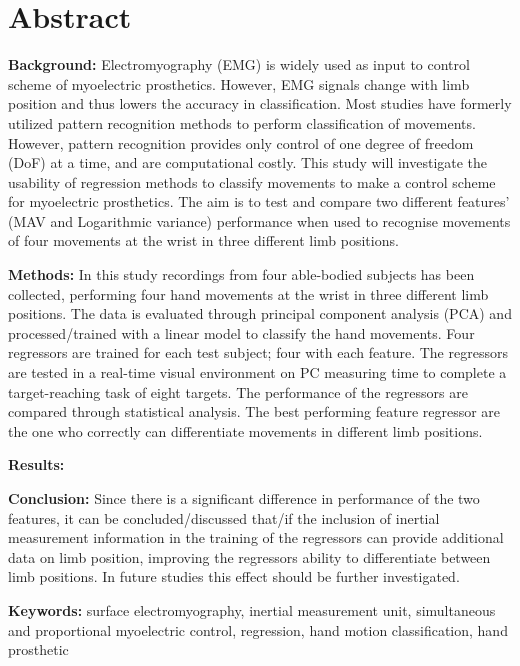 \section{Abstract}

\textbf{Background:} Electromyography (EMG) is widely used as input to control scheme of myoelectric prosthetics. However, EMG signals change with limb position and thus lowers the accuracy in classification.%
Most studies have formerly utilized pattern recognition methods to perform classification of movements.  
However, pattern recognition provides only control of one degree of freedom (DoF) at a time, and are computational costly. This study will investigate the usability of regression methods to classify movements to make a control scheme for myoelectric prosthetics. The aim is to test and compare two different features' (MAV and Logarithmic variance) performance when used to recognise movements of four movements at the wrist in three different limb positions. 



\textbf{Methods:} In this study recordings from four able-bodied subjects has been collected, performing four hand movements at the wrist in three different limb positions. The data is evaluated through principal component analysis (PCA) and processed/trained with a linear model to classify the hand movements. Four regressors are trained for each test subject; four with each feature. The regressors are tested in a real-time visual environment on PC measuring time to complete a target-reaching task of eight targets. The performance of the regressors are compared through statistical analysis. The best performing feature regressor are the one who correctly can differentiate movements in different limb positions. 



 
\textbf{Results:} 


\textbf{Conclusion:} Since there is a significant difference in performance of the two features, it can be concluded/discussed that/if the inclusion of inertial measurement information in the training of the regressors can provide additional data on limb position, improving the regressors ability to differentiate between limb positions. In future studies this effect should be further investigated. 


\textbf{Keywords:} surface electromyography, inertial measurement unit, simultaneous and proportional myoelectric control, regression, hand motion classification, hand prosthetic
